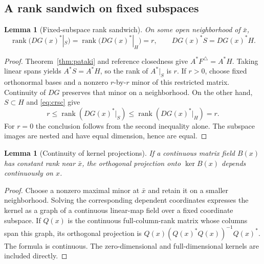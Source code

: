 \documentclass[11pt]{article}
\numberwithin{equation}{section}
\newtheorem{lemma}[theorem]{Lemma}
\theoremstyle{definition}
\theoremstyle{remark}
\DeclareMathOperator{\rank}{rank}
\newcommand{\xb}{\bar x}
\begin{document}
\subsection{A rank sandwich on fixed subspaces}

\begin{lemma}[Fixed-subspace rank sandwich]
\label{lem:sandwich}
On some open neighborhood of $\xb$,
\begin{equation}
 \rank\bigl(DG(x)^*|_S\bigr)
 =\rank\bigl(DG(x)^*|_H\bigr)=r,
 \qquad DG(x)^*S=DG(x)^*H.
 \label{eq:sandwich}
\end{equation}
\end{lemma}
\begin{proof}
Theorem~\ref{thm:pataki} and reference closedness give
$A^*F^\triangle=A^*H$. Taking linear spans yields $A^*S=A^*H$,
so the rank of $A^*|_S$ is $r$. If $r>0$, choose fixed orthonormal bases
and a nonzero $r$-by-$r$ minor of this restricted matrix. Continuity of
$DG$ preserves that minor on a neighborhood. On the other hand,
$S\subset H$ and \eqref{eq:crsc} give
\[
 r\leq\rank(DG(x)^*|_S)
 \leq\rank(DG(x)^*|_H)=r.
\]
For $r=0$ the conclusion follows from the second inequality alone.
The subspace images are nested and have equal dimension, hence are equal.
\end{proof}

\begin{lemma}[Continuity of kernel projections]
\label{lem:kernel}
If a continuous matrix field $B(x)$ has constant rank near $\xb$, the
orthogonal projection onto $\ker B(x)$ depends continuously on $x$.
\end{lemma}
\begin{proof}
Choose a nonzero maximal minor at $\xb$ and retain it on a smaller
neighborhood. Solving the corresponding dependent coordinates expresses
the kernel as a graph of a continuous linear-map field over a fixed
coordinate subspace. If $Q(x)$ is the continuous full-column-rank matrix
whose columns span this graph, its orthogonal projection is
$Q(x)(Q(x)^*Q(x))^{-1}Q(x)^*$. The formula is continuous.
The zero-dimensional and full-dimensional kernels are included directly.
\end{proof}
\end{document}
